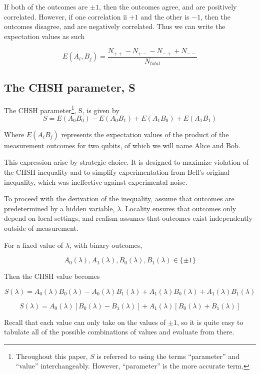 \documentclass[12pt]{article}
\begin{document}
If both of the outcomes are $\pm1$, then the outcomes agree, and are positively correlated. However, if one correlation ii $+1$ and the other is $-1$, then  the outcomes disagree, and are negatively correlated. Thus we can write the expectation values as such

$$
E(A_i, B_j) = \frac{N_{++} - N_{+-} - N_{-+} + N_{--}}{N_{total}}
$$

\subsection{The CHSH parameter, S}


The CHSH parameter\footnote{Throughout this paper, \( S \) is referred to using the terms ``parameter'' and ``value'' interchangeably. However, ``parameter'' is the more accurate term.}, S, is given by
$$
S = E(A_0 B_0) - E(A_0 B_1) + E(A_1 B_0) + E(A_1 B_1)
$$

Where $E(A_i B_j)$ represents the expectation values of the product of the measurement outcomes for two qubits, of which we will name Alice and Bob.

This expression arise by strategic choice. It is designed to maximize violation of the CHSH inequality and to simplify experimentation from Bell's original inequality, which was ineffective against experimental noise. \cite{CHSH1969}

To proceed with the derivation of the inequality, assume that outcomes are predetermined by a hidden variable, $\lambda$. Locality ensures that outcomes only depend on local settings, and realism assumes that outcomes exist independently outside of measurement.

For a fixed value of $\lambda$, with binary outcomes,

$$
A_0(\lambda), A_1(\lambda), B_0(\lambda), B_1(\lambda) \in \{\pm1\}
$$

Then the CHSH value becomes

$$
S(\lambda) = A_0(\lambda)B_0(\lambda) - A_0(\lambda)B_1(\lambda) + A_1(\lambda)B_0(\lambda) + A_1(\lambda)B_1(\lambda)
$$

$$
S(\lambda)= A_0(\lambda) [B_0(\lambda) - B_1(\lambda)] + A_1(\lambda) [B_0(\lambda) + B_1(\lambda)]
$$

Recall that each value can only take on the values of $\pm1$, so it is quite easy to tabulate all of the possible combinations of values and evaluate from there.
\end{document}
